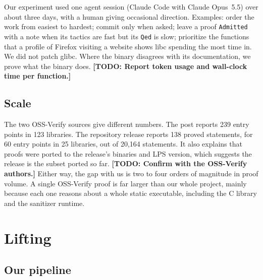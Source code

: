 \documentclass[11pt]{article}
\newcommand{\todo}[1]{\textbf{[TODO: #1]}}
\newcommand{\code}[1]{\texttt{#1}}
\begin{document}
Our experiment used one agent session (Claude Code with Claude Opus~5.5)
over about three days, with a human giving occasional direction.  Examples:
order the work from easiest to hardest; commit only when asked; leave a
proof \code{Admitted} with a note when its tactics are fast but its
\code{Qed} is slow; prioritize the functions that a profile of Firefox
visiting a website shows libc spending the most time in.  We did not patch
glibc.  Where the binary disagrees with its documentation, we prove what
the binary does.  \todo{Report token usage and wall-clock time per
function.}

\subsection{Scale}\label{sec:scale}

The two OSS-Verify sources give different numbers.  The post reports 239
entry points in 123 libraries.  The repository release reports 138 proved
statements, for 60 entry points in 25 libraries, out of 20{,}164 statements.
It also explains that proofs were ported to the release's binaries and LPS
version, which suggests the release is the subset ported so far.
\todo{Confirm with the OSS-Verify authors.}  Either way, the gap with us is
two to four orders of magnitude in proof volume.  A single OSS-Verify proof
is far larger than our whole project, mainly because each one reasons about
a whole static executable, including the C library and the sanitizer
runtime.

\section{Lifting}\label{sec:lifting}

\subsection{Our pipeline}
\end{document}
